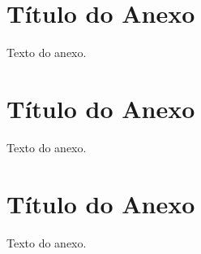 \begin{anexosenv}
    \partanexos

    \chapter{Título do Anexo}
    Texto do anexo.

    \chapter{Título do Anexo}
    Texto do anexo.

    \chapter{Título do Anexo}
    Texto do anexo.
    
\end{anexosenv}